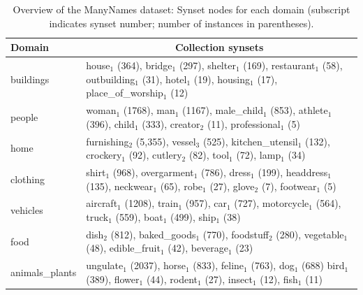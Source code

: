 
\begin{table}[htp]
	\small
	\centering
	\begin{tabular}{lp{14cm}}
			\toprule
			Domain & \multicolumn{1}{c}{Collection synsets}\\
			\midrule			
			buildings      &  house$_1$ (364), bridge$_1$ (297), shelter$_1$ (169), restaurant$_1$ (58),
                                         outbuilding$_1$ (31), hotel$_1$ (19), housing$_1$ (17), place\_of\_worship$_1$ (12)     \\
			people         & woman$_1$ (1768), man$_1$ (1167), male\_child$_1$ (853), athlete$_1$ (396),
			 child$_1$ (333), creator$_2$ (11), professional$_1$ (5)    \\
			home           &  furnishing$_2$ (5,355), vessel$_3$ (525), kitchen\_utensil$_1$ (132), crockery$_1$ (92),
			cutlery$_2$ (82), tool$_1$ (72), lamp$_1$ (34)    \\
			clothing       &  shirt$_1$ (968), overgarment$_1$ (786), dress$_1$ (199), headdress$_1$ (135),
                                         neckwear$_1$ (65), robe$_1$ (27), glove$_2$ (7), footwear$_1$ (5)    \\
			vehicles       &  aircraft$_1$ (1208), train$_1$ (957), car$_1$ (727), motorcycle$_1$ (564),
                                         truck$_1$ (559), boat$_1$ (499), ship$_1$ (38)    \\
			food           &  dish$_2$ (812), baked\_goods$_1$ (770), foodstuff$_2$ (280), vegetable$_1$ (48),
                                         edible\_fruit$_1$ (42), beverage$_1$ (23)   \\
			animals\_plants & ungulate$_1$ (2037), horse$_1$ (833), feline$_1$ (763), dog$_1$ (688)
			bird$_1$ (389), flower$_1$ (44), rodent$_1$ (27), insect$_1$ (12), fish$_1$ (11)\\
			\bottomrule
		\end{tabular}
		\caption{Overview of the ManyNames dataset: Synset nodes for each domain (subscript indicates synset number; number of instances in parentheses).
                  \label{tab:overview_dataset2}}
	\end{table}

